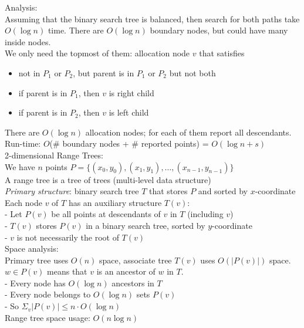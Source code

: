\documentclass[12pt]{article}
\begin{document}
{Analysis:\\
Assuming that the binary search tree is balanced, then search for both paths take $O(\log n)$ time. There are $O(\log n)$ boundary nodes, but could have many inside nodes.\\
We only need the topmost of them: allocation node $v$ that satisfies
\begin{itemize}
	\renewcommand\labelitemi{--}
	\item not in $P_1$ or $P_2$, but parent is in $P_1$ or $P_2$ but not both
	\item if parent is in $P_1$, then $v$ is right child
	\item  if parent is in $P_2$, then $v$ is left child
\end{itemize}
There are $O(\log n)$ allocation nodes; for each of them report all descendants. \\
Run-time: $O$(\# boundary nodes + \# reported points) = $O(\log n + s)$\\

2-dimensional Range Trees:\\
We have $n$ points $P= \{(x_0,y_0),(x_1,y_1), \dots, (x_{n-1}, y_{n-1}) \}$\\
A range tree is a tree of trees (multi-level data structure)\\
\emph{Primary structure}: binary search tree $T$ that stores $P$ and sorted by $x$-coordinate\\
Each node $v$ of $T$ has an auxiliary structure $T(v)$: \\
 - Let $P(v)$ be all points at descendants of $v$ in $T$ (including $v$)\\
- $T(v)$ stores $P(v)$ in a binary search tree, sorted by $y$-coordinate\\
 - $v$ is not necessarily the root of $T(v)$\\

Space analysis:\\
Primary tree uses $O(n) $ space, associate tree $T(v)$ uses $O(|P(v)|)$ space.\\
$w\in P(v)$ means that $v$ is an ancestor of $w$ in $T$.\\
- Every node has $O(\log n)$ ancestors in $T$\\
- Every node belongs to $O(\log n)$ sets $P(v)$\\
- So $\Sigma_v|P(v)| \leq n \cdot O(\log n)$\\
Range tree space usage: $O(n\log n)$\\

}
\end{document}
